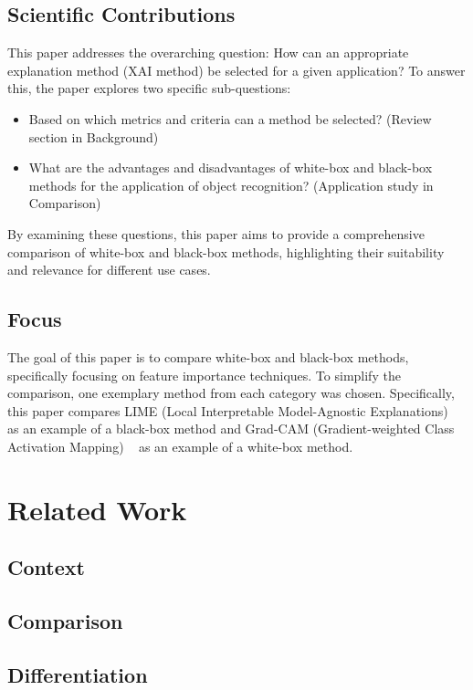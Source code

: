 \documentclass{article}
\begin{document}
\subsection{Scientific Contributions}
This paper addresses the overarching question: How can an appropriate explanation method (XAI method) be selected for a given application? To answer this, the paper explores two specific sub-questions:

\begin{itemize}
    \item Based on which metrics and criteria can a method be selected? (Review section in Background)
    \item What are the advantages and disadvantages of white-box and black-box methods for the application of object recognition? (Application study in Comparison)
\end{itemize}

By examining these questions, this paper aims to provide a comprehensive comparison of white-box and black-box methods, highlighting their suitability and relevance for different use cases.

\subsection{Focus}

The goal of this paper is to compare white-box and black-box methods, specifically focusing on feature importance techniques. To simplify the comparison, one exemplary method from each category was chosen. Specifically, this paper compares LIME (Local Interpretable Model-Agnostic Explanations) ~\cite{ribeiro2016why} as an example of a black-box method and Grad-CAM (Gradient-weighted Class Activation Mapping) ~\cite{Selvaraju_2019} as an example of a white-box method.



\section{Related Work}
\subsection{Context}
\subsection{Comparison}
\subsection{Differentiation}
\end{document}
